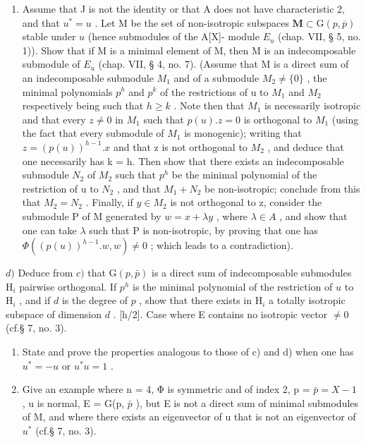\begin{enumerate}
\item
  Assume that J is not the identity or that A does not have characteristic 2, and that \(u^{*} = u\) . Let M be the set of non-isotropic subspaces \(\mathbf{M} \subset \mathrm{G}(p, \overline{p})\) stable under \(u\) (hence submodules of the A{[}X{]}- module \(E_{u}\) (chap. VII, § 5, no. 1)). Show that if M is a minimal element of M, then M is an indecomposable submodule of \(E_{u}\) (chap. VII, § 4, no. 7). (Assume that M is a direct sum of an indecomposable submodule \(M_{1}\) and of a submodule \(M_{2} \neq \{0\}\) , the minimal polynomials \(p^{h}\) and \(p^{k}\) of the restrictions of u to \(M_{1}\) and \(M_{2}\) respectively being such that \(h \geqslant k\) . Note then that \(M_{1}\) is necessarily isotropic and that every \(z \neq 0\) in \(M_{1}\) such that \(p(u).z = 0\) is orthogonal to \(M_{1}\) (using the fact that every submodule of \(M_{1}\) is monogenic); writing that \(z = (p(u))^{h-1}.x\) and that z is not orthogonal to \(M_{2}\) , and deduce that one necessarily has k = h. Then show that there exists an indecomposable submodule \(N_{2}\) of \(M_{2}\) such that \(p^{h}\) be the minimal polynomial of the restriction of u to \(N_{2}\) , and that \(M_{1} + N_{2}\) be non-isotropic; conclude from this that \(M_{2} = N_{2}\) . Finally, if \(y \in M_{2}\) is not orthogonal to z, consider the submodule P of M generated by \(w = x + \lambda y\) , where \(\lambda \in A\) , and show that one can take \(\lambda\) such that P is non-isotropic, by proving that one has \(\Phi((p(u))^{h-1}.w,w) \neq 0\) ; which leads to a contradiction).
\end{enumerate}

\(d)\) Deduce from \(c)\) that \(\mathrm{G}(p,\bar{p})\) is a direct sum of indecomposable submodules \(\mathrm{H}_{i}\) pairwise orthogonal. If \(p^{h}\) is the minimal polynomial of the restriction of \(u\) to \(\mathrm{H}_{i}\) , and if \(d\) is the degree of \(p\) , show that there exists in \(\mathrm{H}_{i}\) a totally isotropic subspace of dimension \(d\) . {[}h/2{]}. Case where E contains no isotropic vector \(\neq 0\) (cf.§ 7, no. 3).

\begin{enumerate}
\def\labelenumi{\alph{enumi})}
\setcounter{enumi}{4}
\item
  State and prove the properties analogous to those of c) and d) when one has \(u^{*} = -u\) or \(u^{*}u = 1\) .
\item
  Give an example where n = 4, Φ is symmetric and of index 2, p = \(\bar{p} = X - 1\) , u is normal, E = G(p, \(\bar{p}\) ), but E is not a direct sum of minimal submodules of M, and where there exists an eigenvector of u that is not an eigenvector of \(u^{*}\) (cf.§ 7, no. 3).
\end{enumerate}

